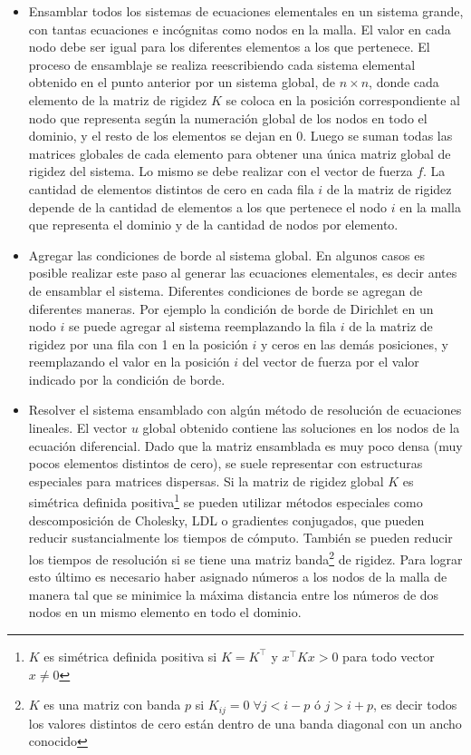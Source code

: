 \begin{itemize}
	\item Ensamblar todos los sistemas de ecuaciones elementales en un sistema grande, con tantas ecuaciones e incógnitas como nodos en la malla. El valor en cada nodo debe ser igual para los diferentes elementos a los que pertenece. El proceso de ensamblaje se realiza reescribiendo cada sistema elemental obtenido en el punto anterior por un sistema global, de $n \times n$, donde cada elemento de la matriz de rigidez $K$ se coloca en la posición correspondiente al nodo que representa según la numeración global de los nodos en todo el dominio, y el resto de los elementos se dejan en 0. Luego se suman todas las matrices globales de cada elemento para obtener una única matriz global de rigidez del sistema. Lo mismo se debe realizar con el vector de fuerza $f$. La cantidad de elementos distintos de cero en cada fila $i$ de la matriz de rigidez depende de la cantidad de elementos a los que pertenece el nodo $i$ en la malla que representa el dominio y de la cantidad de nodos por elemento.
	
	\item Agregar las condiciones de borde al sistema global. En algunos casos es posible realizar este paso al generar las ecuaciones elementales, es decir antes de ensamblar el sistema. Diferentes condiciones de borde se agregan de diferentes maneras. Por ejemplo la condición de borde de Dirichlet en un nodo $i$ se puede agregar al sistema reemplazando la fila $i$ de la matriz de rigidez por una fila con 1 en la posición $i$ y ceros en las demás posiciones, y reemplazando el valor en la posición $i$ del vector de fuerza por el valor indicado por la condición de borde. 
	
	\item Resolver el sistema ensamblado con algún método de resolución de ecuaciones lineales. El vector $u$ global obtenido contiene las soluciones en los nodos de la ecuación diferencial. Dado que la matriz ensamblada es muy poco densa (muy pocos elementos distintos de cero), se suele representar con estructuras especiales para matrices dispersas. Si la matriz de rigidez global $K$ es simétrica definida positiva\footnote{$K$ es simétrica definida positiva si $K = K^\intercal$ y $x^\intercal K x > 0$ para todo vector $x \neq 0$} se pueden utilizar métodos especiales como descomposición de Cholesky, LDL o gradientes conjugados, que pueden reducir sustancialmente los tiempos de cómputo. También se pueden reducir los tiempos de resolución si se tiene una matriz banda\footnote{$K$ es una matriz con banda $p$ si $K_{ij} = 0 \; \forall j < i-p$ ó $j > i+p$, es decir todos los valores distintos de cero están dentro de una banda diagonal con un ancho conocido} de rigidez. Para lograr esto último es necesario haber asignado números a los nodos de la malla de manera tal que se minimice la máxima distancia entre los números de dos nodos en un mismo elemento en todo el dominio.\\
\end{itemize}

